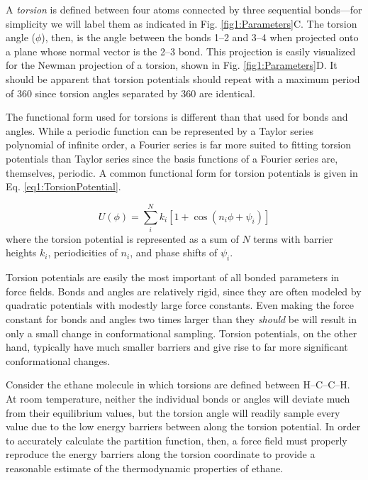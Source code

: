 A \emph{torsion} is defined between four atoms connected by three sequential
bonds---for simplicity we will label them as indicated in Fig.
\ref{fig1:Parameters}C. The torsion angle ($\phi$), then, is the angle between
the bonds 1--2 and 3--4 when projected onto a plane whose normal vector is the
2--3 bond.  This projection is easily visualized for the Newman projection of a
torsion, shown in Fig. \ref{fig1:Parameters}D. It should be apparent that
torsion potentials should repeat with a maximum period of 360\textdegree{} since
torsion angles separated by 360\textdegree{} are identical.

The functional form used for torsions is different than that used for bonds and
angles. While a periodic function can be represented by a Taylor series
polynomial of infinite order, a Fourier series is far more suited to fitting
torsion potentials than Taylor series since the basis functions of a Fourier
series are, themselves, periodic. A common functional form for torsion
potentials is given in Eq. \ref{eq1:TorsionPotential}.
\cite{Cramer_Book_EssentialsCompChem_2004}

\begin{equation}
   U(\phi) = \sum_i^N k _ i \left [ 1 + \cos \left ( n_i \phi + \psi _ i \right )
             \right ]
   \label{eq1:TorsionPotential}
\end{equation}
where the torsion potential is represented as a sum of $N$ terms with barrier
heights $k_i$, periodicities of $n_i$, and phase shifts of $\psi _ i$.

Torsion potentials are easily the most important of all bonded parameters in
force fields. Bonds and angles are relatively rigid, since they are often
modeled by quadratic potentials with modestly large force constants. Even making
the force constant for bonds and angles two times larger than they \emph{should}
be will result in only a small change in conformational sampling. Torsion
potentials, on the other hand, typically have much smaller barriers and give
rise to far more significant conformational changes.

Consider the ethane molecule in which torsions are defined between H--C--C--H.
At room temperature, neither the individual bonds or angles will deviate much
from their equilibrium values, but the torsion angle will readily sample every
value due to the low energy barriers between along the torsion potential. In
order to accurately calculate the partition function, then, a force field must
properly reproduce the energy barriers along the torsion coordinate to provide a
reasonable estimate of the thermodynamic properties of ethane.

